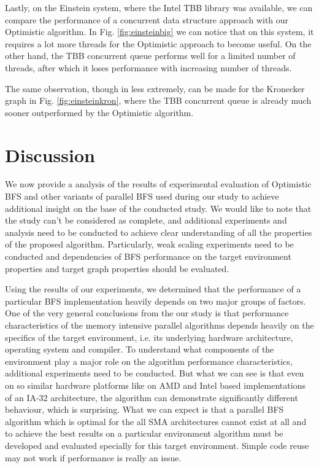 \documentclass[letterpaper]{article}
\begin{document}
		Lastly, on the Einstein system, where the Intel TBB library was available, we can compare the performance of a concurrent data structure approach with our Optimistic algorithm.
		In Fig. \ref{fig:einsteinbig} we can notice that on this system, it requires a lot more threads for the Optimistic approach to become useful. On the other hand, the TBB concurrent queue performs well for a limited number of threads, after which it loses performance with increasing number of threads.
		
		The same observation, though in less extremely, can be made for the Kronecker graph in Fig. \ref{fig:einsteinkron}, where the TBB concurrent queue is already much sooner outperformed by the Optimistic algorithm.


	\section{Discussion}\label{sec:disc} %
		We now provide a analysis of the results of experimental evaluation of Optimistic BFS and other variants of parallel BFS used during our study to achieve additional insight on the base of the conducted study.
		We would like to note that the study can't be considered as complete, and additional experiments and analysis need to be conducted to achieve clear understanding of all the properties of the proposed algorithm.  
		Particularly, weak scaling experiments need to be conducted and dependencies of BFS performance on the target environment properties and target graph properties should be evaluated. 
		
		Using the results of our experiments, we determined that the performance of a particular BFS implementation heavily depends on two major groups of factors.
		One of the very general conclusions from the our study is that performance characteristics of the memory intensive parallel algorithms depends heavily on the specifics of the target environment, i.e. its underlying hardware architecture, operating system and compiler.
		To understand what components of the environment play a major role on the algorithm performance characteristics, additional experiments need to be conducted.
		But what we can see is that even on so similar hardware platforms like on AMD and Intel based implementations of an IA-32 architecture, the algorithm can demonstrate significantly different behaviour, which is surprising.
		What we can expect is that a parallel BFS algorithm which is optimal for the all SMA architectures cannot exist at all and to achieve the best results on a particular environment algorithm must be developed and evaluated specially for this target environment.
		Simple code reuse may not work if performance is really an issue.
		
\end{document}

